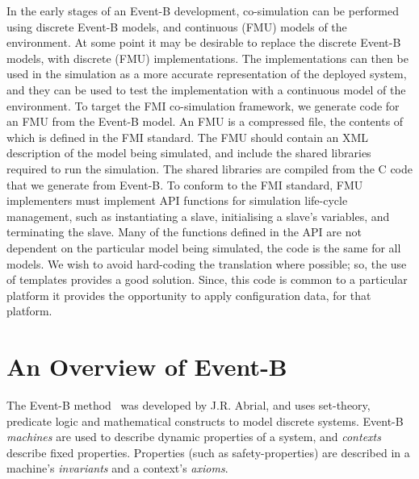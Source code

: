 \documentclass{llncs}%
\begin{document}
In the early stages of an Event-B development, co-simulation can be performed using discrete Event-B models, and continuous (FMU) models of the environment. At some point it may be desirable to replace the discrete Event-B models, with discrete (FMU) implementations. The implementations can then be used in the simulation as a more accurate representation of the deployed system, and they can be used to test the implementation with a continuous model of the environment. To target the FMI co-simulation framework, we generate code for an FMU from the Event-B model. An FMU is a compressed file, the contents of which is defined in the FMI standard. The FMU should contain an XML description of the model being simulated, and include the shared libraries required to run the simulation. The shared libraries are compiled from the C code that we generate from Event-B. To conform to the FMI standard, FMU implementers must implement API functions for simulation life-cycle management, such as instantiating a slave, initialising a slave's variables, and terminating the slave. Many of the functions defined in the API are not dependent on the particular model being simulated, the code is the same for all models. We wish to avoid hard-coding the translation where possible; so, the use of templates provides a good solution. Since, this code is common to a particular platform it provides the opportunity to apply configuration data, for that platform.   
%
\section{An Overview of Event-B}\label{EB}
%
The Event-B method~\cite{ABR10} was developed by J.R. Abrial, and uses set-theory, predicate logic and mathematical constructs to model discrete systems. Event-B \emph{machines} are used to describe dynamic properties of a system, and \emph{contexts} describe fixed properties. Properties (such as safety-properties) are described in a machine's \emph{invariants} and a context's \emph{axioms}. 
\end{document}
